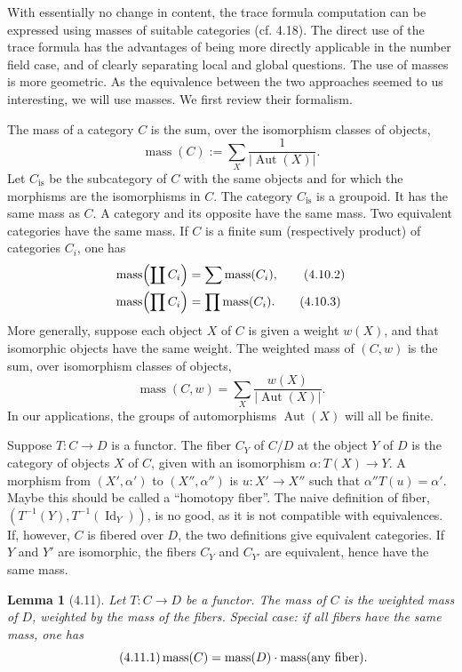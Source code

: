 \documentclass[10pt]{article}
\newcommand{\Aut}{\operatorname{Aut}}
\newcommand{\mass}{\operatorname{mass}}
\newcommand{\Id}{\operatorname{Id}}
\theoremstyle{deligne}
\newtheorem*{lemma*}{Lemma}
\newcommand{\heading}[1]{\vspace{0.7em}\noindent{\bfseries #1}\quad}
\begin{document}
With essentially no change in content, the trace formula computation can be expressed using masses of suitable categories (cf. 4.18). The direct use of the trace formula has the advantages of being more directly applicable in the number field case, and of clearly separating local and global questions. The use of masses is more geometric. As the equivalence between the two approaches seemed to us interesting, we will use masses. We first review their formalism.

\heading{4.10.} The mass of a category $C$ is the sum, over the isomorphism classes of objects,
\begin{equation}\tag{4.10.1}
\mass(C):=\sum_X \frac{1}{|\Aut(X)|}.
\end{equation}
Let $C_{\mathrm{is}}$ be the subcategory of $C$ with the same objects and for which the morphisms are the isomorphisms in $C$. The category $C_{\mathrm{is}}$ is a groupoid. It has the same mass as $C$. A category and its opposite have the same mass. Two equivalent categories have the same mass. If $C$ is a finite sum (respectively product) of categories $C_i$, one has
\begin{align}
\mass\Bigl(\coprod C_i\Bigr)&=\sum \mass(C_i), \tag{4.10.2}\\
\mass\Bigl(\prod C_i\Bigr)&=\prod \mass(C_i). \tag{4.10.3}
\end{align}
More generally, suppose each object $X$ of $C$ is given a weight $w(X)$, and that isomorphic objects have the same weight. The weighted mass of $(C,w)$ is the sum, over isomorphism classes of objects,
\begin{equation}\tag{4.10.4}
\mass(C,w)=\sum_X \frac{w(X)}{|\Aut(X)|}.
\end{equation}
In our applications, the groups of automorphisms $\Aut(X)$ will all be finite.

Suppose $T:C\to D$ is a functor. The fiber $C_Y$ of $C/D$ at the object $Y$ of $D$ is the category of objects $X$ of $C$, given with an isomorphism $\alpha:T(X)\to Y$. A morphism from $(X',\alpha')$ to $(X'',\alpha'')$ is $u:X'\to X''$ such that $\alpha''T(u)=\alpha'$. Maybe this should be called a ``homotopy fiber''. The naive definition of fiber, $(T^{-1}(Y),T^{-1}(\Id_Y))$, is no good, as it is not compatible with equivalences. If, however, $C$ is fibered over $D$, the two definitions give equivalent categories. If $Y$ and $Y'$ are isomorphic, the fibers $C_Y$ and $C_{Y'}$ are equivalent, hence have the same mass.

\begin{lemma*}[4.11]
Let $T:C\to D$ be a functor. The mass of $C$ is the weighted mass of $D$, weighted by the mass of the fibers. Special case: if all fibers have the same mass, one has
\begin{equation}\tag{4.11.1}
\mass(C)=\mass(D)\cdot \mass(\hbox{any fiber}).
\end{equation}
\end{lemma*}
\end{document}
